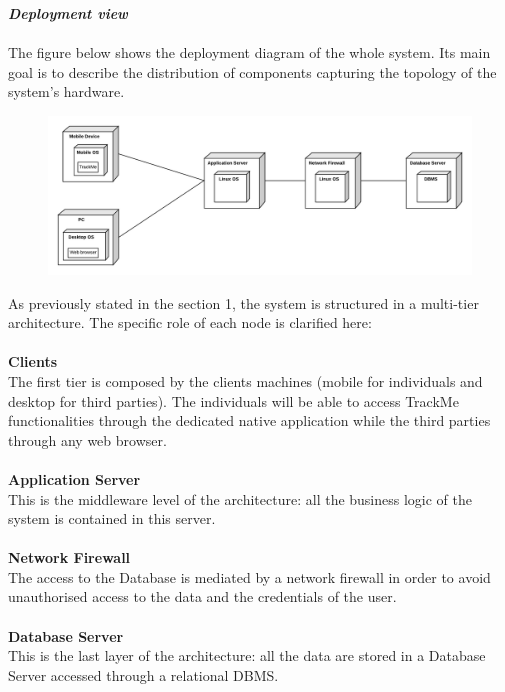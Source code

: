 \begin{legal}
		\item \textit{\textbf{Deployment view}}\\\\
		The figure below shows the deployment diagram of the whole system. Its main goal is to describe the distribution of components capturing the topology of the
system's hardware.\\
		\begin{figure}[H]
		\includegraphics[width=\linewidth]{../images/design/DeploymentDiagram.png}\\
		\end{figure}
		As previously stated in the section 1, the system is structured in a multi-tier architecture. The specific role of each node is clarified here:\\\\
		\textbf{Clients}\\
The first tier is composed by the clients machines (mobile for individuals and desktop for third parties). The individuals will be able to access TrackMe functionalities through the dedicated native application while the third parties through any web browser.\\\\
		\textbf{Application Server}\\
This is the middleware level of the architecture: all the business logic of
the system is contained in this server.\\\\
		\textbf{Network Firewall}\\
The access to the Database is mediated by a network firewall in order to
avoid unauthorised access to the data and the credentials of the user.\\\\
		\textbf{Database Server}\\
This is the last layer of the architecture: all the data are stored in a Database Server accessed through a relational DBMS. \\\\


\end{legal}
